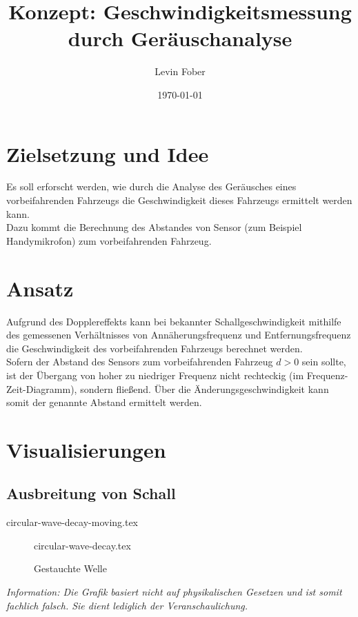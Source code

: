 \documentclass[12pt, a4paper]{article}
\title{Konzept: Ge\-schwin\-dig\-keits\-mes\-sung durch Ge\-räusch\-ana\-ly\-se}
\author{Levin Fober}
\date{\today}
\begin{document}
\maketitle

\tableofcontents

\newpage

\section{Zielsetzung und Idee}
Es soll erforscht werden, wie durch die Analyse des Geräusches eines
vorbeifahrenden Fahrzeugs die Geschwindigkeit dieses Fahrzeugs ermittelt werden
kann. \\
Dazu kommt die Berechnung des Abstandes von Sensor (zum Beispiel Handymikrofon)
zum vorbeifahrenden Fahrzeug.

\section{Ansatz}
Aufgrund des Dopplereffekts kann bei bekannter Schallgeschwindigkeit mithilfe
des gemessenen Verhältnisses von Annäherungsfrequenz und Entfernungsfrequenz die
Geschwindigkeit des vorbeifahrenden Fahrzeugs berechnet werden.\\
Sofern der Abstand des Sensors zum vorbeifahrenden Fahrzeug \(d > 0\) sein
sollte, ist der Übergang von hoher zu niedriger Frequenz nicht rechteckig (im
Frequenz-Zeit-Diagramm), sondern fließend. Über die Änderungsgeschwindigkeit
kann somit der genannte Abstand ermittelt werden.

\section{Visualisierungen}

\subsection{Ausbreitung von Schall}

{circular-wave-decay-moving.tex}

\begin{minipage}{0.5\textwidth}
    \begin{figure}[H]
        {circular-wave-decay.tex}
        \caption{Gestauchte Welle}
    \end{figure}
\end{minipage} \hfill
\begin{minipage}{0.45\textwidth}
    \begin{footnotesize}
        \emph{Information: Die Grafik basiert nicht auf physikalischen Gesetzen und ist somit fachlich falsch. Sie dient lediglich der Veranschaulichung.}
    \end{footnotesize}
\end{minipage}
\vspace{1cm}
\end{document}
